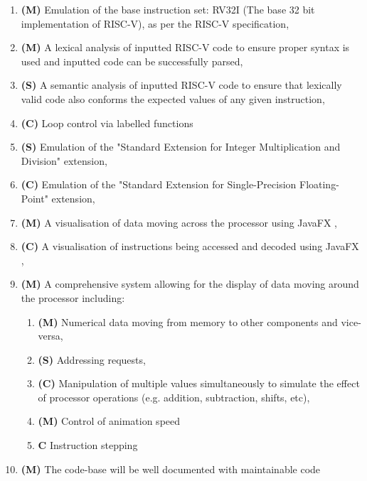 \begin{enumerate}
    \item \textbf{(M)} Emulation of the base instruction set: RV32I \cite{waterman_2019_the} (The base 32 bit implementation of RISC-V), as per the RISC-V specification,
    \item \textbf{(M)} A lexical analysis of inputted RISC-V code to ensure proper syntax is used and inputted code can be successfully parsed,
    \item \textbf{(S)} A semantic analysis of inputted RISC-V code to ensure that lexically valid code also conforms the expected values of any given instruction,
    \item \textbf{(C)} Loop control via labelled functions
    \item \label{req:md} \textbf{(S)} Emulation of the "Standard Extension for Integer Multiplication and Division" extension,
    \item \label{req:fp} \textbf{(C)} Emulation of the "Standard Extension for Single-Precision Floating-Point" extension,
    \item \textbf{(M)} A visualisation of data moving across the processor using JavaFX \cite{sunmicrosystems_2022_javafx},
    \item \textbf{(C)} A visualisation of instructions being accessed and decoded using JavaFX \cite{sunmicrosystems_2022_javafx},
    \item \textbf{(M)} A comprehensive system allowing for the display of data moving around the processor including:
    \begin{enumerate}
        \item \textbf{(M)} Numerical data moving from memory to other components and vice-versa,
        \item \textbf{(S)} Addressing requests,
        \item \textbf{(C)} Manipulation of multiple values simultaneously to simulate the effect of processor operations (e.g. addition, subtraction, shifts, etc),
        \item \textbf{(M)} Control of animation speed
        \item \textbf{{C}} Instruction stepping
    \end{enumerate}
    \item \textbf{(M)} The code-base will be well documented with maintainable code
\end{enumerate}

